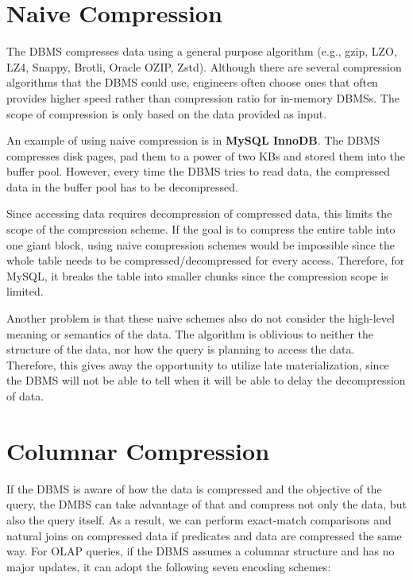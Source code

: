 \documentclass[11pt]{article}
\begin{document}
\section{Naive Compression}
The DBMS compresses data using a general purpose algorithm (e.g., gzip, LZO, LZ4, Snappy,
Brotli, Oracle OZIP, Zstd). Although there are several compression algorithms that the DBMS could
use, engineers often choose ones that often provides higher speed rather than compression ratio for
in-memory DBMSs. The scope of compression is only based on the data provided as input.

An example of using naive compression is in \textbf{MySQL InnoDB}. The DBMS compresses disk
pages, pad them to a power of two KBs and stored them into the buffer pool. However, every time the
DBMS tries to read data, the compressed data in the buffer pool has to be decompressed.

Since accessing data requires decompression of compressed data, this limits the scope of the
compression scheme. If the goal is to compress the entire table into one giant block, using naive
compression schemes would be impossible since the whole table needs to be compressed/decompressed
for every access. Therefore, for MySQL, it breaks the table into smaller chunks since the
compression scope is limited.

Another problem is that these naive schemes also do not consider the high-level meaning or
semantics of the data. The algorithm is oblivious to neither the structure of the data, nor how the
query is planning to access the data. Therefore, this gives away the opportunity to utilize late
materialization, since the DBMS will not be able to tell when it will be able to delay the
decompression of data.

\section{Columnar Compression}
If the DBMS is aware of how the data is compressed and the objective of the query, the DMBS can
take advantage of that and compress not only the data, but also the query itself. As a result, we
can perform exact-match comparisons and natural joins on compressed data if predicates and
data are compressed the same way.
For OLAP queries, if the DBMS assumes a columnar structure and has no major updates, it can adopt the following seven encoding schemes:
\end{document}

